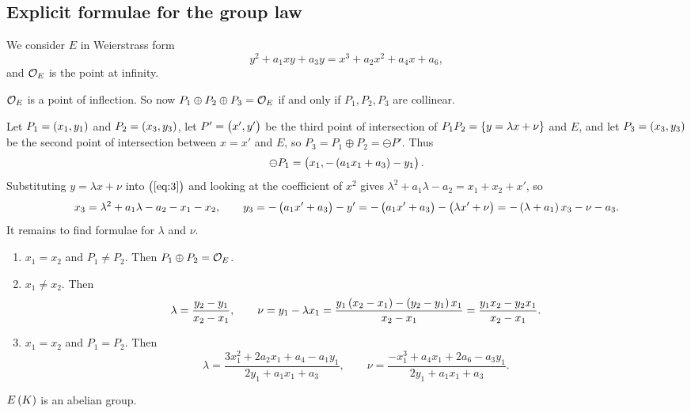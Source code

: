 \subsection{Explicit formulae for the group law}


We consider $ E $ in Weierstrass form
\begin{equation}
\label{eq:3}
y^2 + a_1xy + a_3y = x^3 + a_2x^2 + a_4x + a_6,
\end{equation}
and $ \mathcal{O}_E $ is the point at infinity.

\begin{remark*}
$ \mathcal{O}_E $ is a point of inflection. So now $ P_1 \oplus P_2 \oplus P_3 = \mathcal{O}_E $ if and only if $ P_1, P_2, P_3 $ are collinear.
\end{remark*}

Let $ P_1 = \br{x_1, y_1} $ and $ P_2 = \br{x_3, y_3} $, let $ P' = \br{x', y'} $ be the third point of intersection of $ P_1P_2 = \cbr{y = \lambda x + \nu} $ and $ E $, and let $ P_3 = \br{x_3, y_3} $ be the second point of intersection between $ x = x' $ and $ E $, so $ P_3 = P_1 \oplus P_2 = \ominus P' $. Thus
$$ \ominus P_1 = \br{x_1, -\br{a_1x_1 + a_3} - y_1}. $$
Substituting $ y = \lambda x + \nu $ into $ \br{\ref{eq:3}} $ and looking at the coefficient of $ x^2 $ gives $ \lambda^2 + a_1\lambda - a_2 = x_1 + x_2 + x' $, so
$$ x_3 = \lambda^2 + a_1\lambda - a_2 - x_1 - x_2, \qquad y_3 = -\br{a_1x' + a_3} - y' = -\br{a_1x' + a_3} - \br{\lambda x' + \nu} = -\br{\lambda + a_1}x_3 - \nu - a_3. $$
It remains to find formulae for $ \lambda $ and $ \nu $.
\begin{enumerate}[leftmargin=0.5in, label=Case \arabic*.]
\item $ x_1 = x_2 $ and $ P_1 \ne P_2 $. Then $ P_1 \oplus P_2 = \mathcal{O}_E $.
\item $ x_1 \ne x_2 $. Then
$$ \lambda = \dfrac{y_2 - y_1}{x_2 - x_1}, \qquad \nu = y_1 - \lambda x_1 = \dfrac{y_1\br{x_2 - x_1} - \br{y_2 - y_1}x_1}{x_2 - x_1} = \dfrac{y_1x_2 - y_2x_1}{x_2 - x_1}. $$
\item $ x_1 = x_2 $ and $ P_1 = P_2 $. Then
$$ \lambda = \dfrac{3x_1^2 + 2a_2x_1 + a_4 - a_1y_1}{2y_1 + a_1x_1 + a_3}, \qquad \nu = \dfrac{-x_1^3 + a_4x_1 + 2a_6 - a_3y_1}{2y_1 + a_1x_1 + a_3}. $$
\end{enumerate}

\begin{corollary}
$ E\br{K} $ is an abelian group.
\end{corollary}

